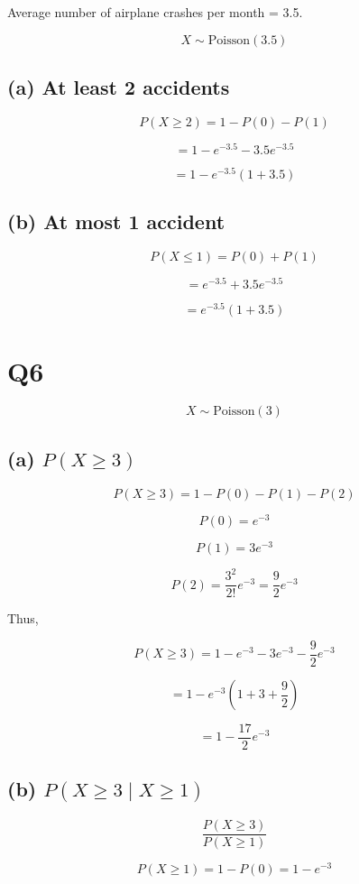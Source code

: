 \documentclass[12pt]{article}
\begin{document}
Average number of airplane crashes per month = 3.5.

\[
X \sim \text{Poisson}(3.5)
\]

\subsection*{(a) At least 2 accidents}

\[
P(X \ge 2)
=
1 - P(0) - P(1)
\]

\[
= 1 - e^{-3.5} - 3.5 e^{-3.5}
\]

\[
= 1 - e^{-3.5}(1+3.5)
\]

\subsection*{(b) At most 1 accident}

\[
P(X \le 1)
=
P(0) + P(1)
\]

\[
= e^{-3.5} + 3.5 e^{-3.5}
\]

\[
= e^{-3.5}(1+3.5)
\]

\section*{Q6}

\[
X \sim \text{Poisson}(3)
\]

\subsection*{(a) $P(X \ge 3)$}

\[
P(X \ge 3)
=
1 - P(0) - P(1) - P(2)
\]

\[
P(0) = e^{-3}
\]

\[
P(1) = 3e^{-3}
\]

\[
P(2) = \frac{3^2}{2!}e^{-3} = \frac{9}{2}e^{-3}
\]

Thus,

\[
P(X \ge 3)
=
1 - e^{-3} - 3e^{-3} - \frac{9}{2}e^{-3}
\]

\[
= 1 - e^{-3}\left(1+3+\frac{9}{2}\right)
\]

\[
= 1 - \frac{17}{2}e^{-3}
\]

\subsection*{(b) $P(X \ge 3 \mid X \ge 1)$}

\[
\frac{P(X \ge 3)}{P(X \ge 1)}
\]

\[
P(X \ge 1)
=
1 - P(0)
=
1 - e^{-3}
\]
\end{document}
